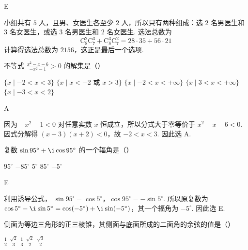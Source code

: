 \documentclass[UTF8,a4paper,oneside,11pt]{ctexbook}
\begin{document}
\begin{answer}
E
\end{answer}

\begin{solution}
小组共有 \(5\) 人，且男、女医生各至少 \(2\) 人，所以只有两种组成：选 \(2\) 名男医生和 \(3\) 名女医生，或选 \(3\) 名男医生和 \(2\) 名女医生. 选法总数为
\[
\mathrm C_8^2\mathrm C_7^3+\mathrm C_8^3\mathrm C_7^2=28\cdot35+56\cdot21
\]
计算得选法总数为 \(2156\)，这正是最后一个选项.
\end{solution}


\begin{problem}

不等式 \(\frac{x^2 - x - 6}{-x^2 - 1} > 0\) 的解集是（\quad）

\choicesfive
    {\(\{x\mid -2 < x < 3\}\)}
    {\(\{x\mid x < -2 \text{\ 或\ } x > 3\}\)}
    {\(\{x\mid -2 < x < +\infty \}\)}
    {\(\{x\mid 3 < x < +\infty \}\)}
    {\(\{x\mid -3 < x < 2\}\)}
\end{problem}

\begin{answer}
A
\end{answer}

\begin{solution}
因为 \(-x^2-1<0\) 对任意实数 \(x\) 恒成立，所以分式大于零等价于 \(x^2-x-6<0\). 因式分解得 \((x-3)(x+2)<0\)，故 \(-2<x<3\). 因此选 A.
\end{solution}


\begin{problem}

复数 \(\sin95^{\circ}+\i\cos95^{\circ} \) 的一个辐角是（\quad）

\choicesfive
    {\(95^{\circ}\)}
    {\(-85^{\circ}\)}
    {\(5^{\circ} \)}
    {\(85^{\circ} \)}
    {\(-5^{\circ}\)}
\end{problem}

\begin{answer}
E
\end{answer}

\begin{solution}
利用诱导公式，
\(\sin95^{\circ}=\cos5^{\circ}\)，\(\cos95^{\circ}=-\sin5^{\circ}\).
所以原复数为 \(\cos5^{\circ}-\i\sin5^{\circ}=\cos(-5^{\circ})+\i\sin(-5^{\circ})\)，其一个辐角为 \(-5^{\circ}\). 因此选 E.
\end{solution}


\begin{problem}

侧面为等边三角形的正三棱锥，其侧面与底面所成的二面角的余弦的值是（\quad）

\choicesfive
    {\(\frac{1}{2}\)}
    {\(\frac{\sqrt{2}}{3}\)}
    {\(\frac{1}{3}\)}
    {\(\frac{\sqrt{2}}{2}\)}
    {\(\frac{\sqrt{3}}{2}\)}
\end{problem}
\end{document}
